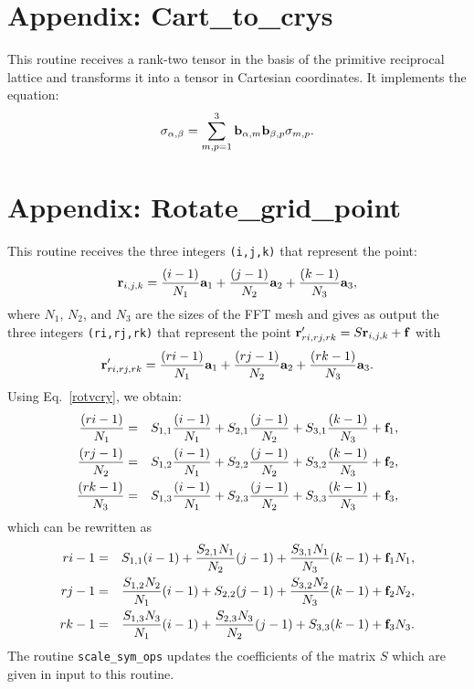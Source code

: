 \documentclass[12pt,a4paper,twoside]{report}
\begin{document}
\section{Appendix: Cart\_to\_crys}
This routine receives a rank-two tensor in the basis of the primitive reciprocal lattice and transforms it into a tensor in Cartesian coordinates. It implements the equation:
\begin{equation}
\sigma_{\alpha,\beta}=\sum_{m,p=1}^3
{\bf b}_{\alpha,m} {\bf b}_{\beta,p} \sigma_{m,p}.
\end{equation}

\section{Appendix: Rotate\_grid\_point}

This routine receives the three integers
\texttt{(i,j,k)} that represent the point:
\begin{equation}
{\bf r}_{i,j,k}= {(i-1) \over N_1} {\bf a}_1 +
{(j-1) \over N_2} {\bf a}_2 +
{(k-1) \over N_3} {\bf a}_3,
\end{equation}
where $N_1$, $N_2$, and $N_3$ are the sizes of the FFT mesh and gives as output the three integers
\texttt{(ri,rj,rk)} that represent the point
${\bf r}'_{ri,rj,rk}=S {\bf r}_{i,j,k}+{\bf f}$ with
\begin{equation}
{\bf r}'_{ri,rj,rk}= {(ri-1) \over N_1} {\bf a}_1 +
{(rj-1) \over N_2} {\bf a}_2 +
{(rk-1) \over N_3} {\bf a}_3.
\end{equation}
Using Eq.~\ref{rotvcry}, we obtain:
\begin{eqnarray}
{(ri-1) \over N_1} &=& S_{1,1} {(i-1) \over N_1}+
S_{2,1} {(j-1) \over N_2} + S_{3,1} {(k-1) \over N_3} + {\bf f}_1, \nonumber \\
{(rj-1) \over N_2} &=& S_{1,2} {(i-1) \over N_1}+
S_{2,2} {(j-1) \over N_2} + S_{3,2} {(k-1) \over N_3} + {\bf f}_2, \nonumber \\
{(rk-1) \over N_3} &=& S_{1,3} {(i-1) \over N_1}+
S_{2,3} {(j-1) \over N_2} + S_{3,3} {(k-1) \over N_3} + {\bf f}_3, 
\end{eqnarray}
which can be rewritten as
\begin{eqnarray}
ri-1 &=& S_{1,1} (i-1) +
{S_{2,1} N_1 \over N_2} (j-1) + {S_{3,1} N_1 \over N_3} (k-1) + {\bf f}_1 N_1, \nonumber \\
rj-1 &=& {S_{1,2} N_2 \over N_1} (i-1)+
S_{2,2} (j-1) + {S_{3,2} N_2 \over N_3}(k-1) + {\bf f}_2 N_2, \nonumber \\
rk-1 &=& {S_{1,3} N_3 \over N_1} (i-1) +
{S_{2,3} N_3 \over N_2}(j-1) + S_{3,3} (k-1)  + {\bf f}_3 N_3. 
\end{eqnarray}
The routine \texttt{scale\_sym\_ops} updates the coefficients of the matrix $S$ which are given in input to this routine. 
\end{document}

